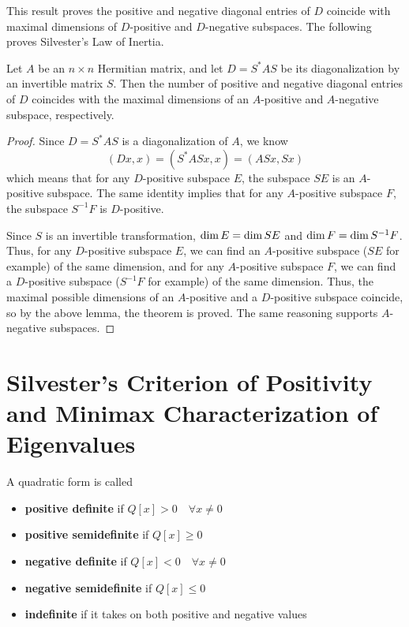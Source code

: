This result proves the positive and negative diagonal entries of $D$ coincide with maximal dimensions of $D$-positive and $D$-negative subspaces. The following proves Silvester's Law of Inertia. 

\begin{theorem}
Let $A$ be an $n \times n$ Hermitian matrix, and let $D = S^{*} AS$ be its diagonalization by an invertible matrix $S$. Then the number of positive and negative diagonal entries of $D$ coincides with the maximal dimensions of an $A$-positive and $A$-negative subspace, respectively. 
\end{theorem}

\begin{proof}
Since $D = S^{*}AS$ is a diagonalization of $A$, we know 
$$(Dx, x) = (S^{*}ASx, x) = (ASx, Sx)$$
which means that for any $D$-positive subspace $E$, the subspace $SE$ is an $A$-positive subspace. The same identity implies that for any $A$-positive subspace $F$, the subspace $S^{-1}F$ is $D$-positive. 

Since $S$ is an invertible transformation, $\operatorname{dim} E = \operatorname{dim} SE$ and $\operatorname{dim} F = \operatorname{dim} S^{-1}F$. Thus, for any $D$-positive subspace $E$, we can find an $A$-positive subspace ($SE$ for example) of the same dimension, and for any $A$-positive subspace $F$, we can find a $D$-positive subspace ($S^{-1}F$ for example) of the same dimension. Thus, the maximal possible dimensions of an $A$-positive and a $D$-positive subspace coincide, so by the above lemma, the theorem is proved. The same reasoning supports $A$-negative subspaces. 
\end{proof}

\section{Silvester's Criterion of Positivity and Minimax Characterization of Eigenvalues}

\begin{definition}
A quadratic form is called 
\begin{itemize}
	\item \textbf{positive definite} if $Q[x] > 0 \quad \forall x \neq 0$
	\item \textbf{positive semidefinite} if $Q[x] \geq 0$
	\item \textbf{negative definite} if $Q[x] < 0 \quad \forall x \neq 0$ 
	\item \textbf{negative semidefinite} if $Q[x] \leq 0$ 
	\item \textbf{indefinite} if it takes on both positive and negative values 
\end{itemize}
\end{definition}

